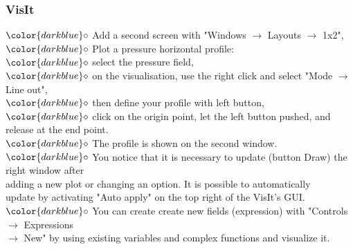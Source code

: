 \documentclass[10pt, hyperref={unicode=true,pdfusetitle, bookmarks=true,bookmarksnumbered=false,bookmarksopen=false, breaklinks=false,pdfborder={0 0 1},backref=true,colorlinks=true,linkcolor=darkblue,pageanchor}]{beamer}
\begin{document}
\begin{frame}
\frametitle{VisIt}
\begin{block}{}

\hspace{1cm} $\color{darkblue}\circ$ {\small{Add a second screen with "Windows $\rightarrow$ Layouts $\rightarrow$ 1x2",}}\\

\hspace{1cm} $\color{darkblue}\circ$ {\small{Plot a pressure horizontal profile:\\}}
\hspace{1.5cm} $\color{darkblue}\diamond$ {\footnotesize{ select the pressure field,}} \\ 
\hspace{1.5cm} $\color{darkblue}\diamond$ {\footnotesize{ on the visualisation, use the right click and select "Mode $\rightarrow$ Line out",}}\\
\hspace{1.5cm} $\color{darkblue}\diamond$ {\footnotesize{ then define your profile with left button,}} \\
\hspace{1.5cm} $\color{darkblue}\diamond$ {\footnotesize{ click on the origin point, let the left button pushed, and release at the end point.}}\\
\hspace{1.5cm} $\color{darkblue}\diamond$ {\footnotesize{ The profile is shown on the second window.}}\\

\hspace{1cm} $\color{darkblue}\circ$ {\small{You notice that it is necessary to update (button Draw) the right window after \\
\hspace{1.3cm} adding a new plot or changing an option. It is possible to automatically \\
\hspace{1.3cm} update by activating "Auto apply" on the top right of the VisIt's GUI.}}\\

\hspace{1cm} $\color{darkblue}\circ$ {\small{You can create create new fields (expression) with "Controls $\rightarrow$ Expressions \\
\hspace{1.3cm} $\rightarrow$ New" by using existing variables and complex functions and visualize it.}}\\


\end{block}
\end{frame}
\end{document}
